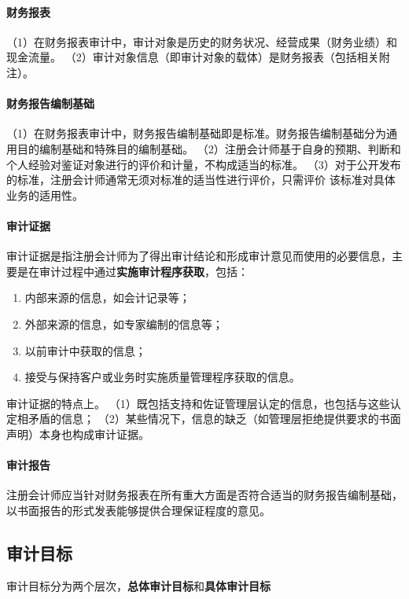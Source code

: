 \documentclass[UTF8,12pt]{ctexart}
\numberwithin{equation}{section} %
\numberwithin{figure}{section}
\numberwithin{table}{section}
\begin{document}
	\paragraph{财务报表}
	（1）在财务报表审计中，审计对象是历史的财务状况、经营成果（财务业绩）和现金流量。
	（2）审计对象信息（即审计对象的载体）是财务报表（包括相关附注）。
	
	\paragraph{财务报告编制基础}
	（1）在财务报表审计中，财务报告编制基础即是标准。财务报告编制基础分为通用目的编制基础和特殊目的编制基础。
	（2）注册会计师基于自身的预期、判断和个人经验对鉴证对象进行的评价和计量，不构成适当的标准。
	（3）对于公开发布的标准，注册会计师通常无须对标准的适当性进行评价，只需评价
	该标准对具体业务的适用性。
	
	\paragraph{审计证据}
	审计证据是指注册会计师为了得出审计结论和形成审计意见而使用的必要信息，主要是在审计过程中通过\textbf{实施审计程序获取}，包括：
	\begin{enumerate}
		\item 内部来源的信息，如会计记录等；
		
		\item 外部来源的信息，如专家编制的信息等；
		
		\item 以前审计中获取的信息；
		
		\item 接受与保持客户或业务时实施质量管理程序获取的信息。
	\end{enumerate}
	
	审计证据的特点上。
	（1）既包括支持和佐证管理层认定的信息，也包括与这些认定相矛盾的信息；
	（2）某些情况下，信息的缺乏（如管理层拒绝提供要求的书面声明）本身也构成审计证据。
	
	\paragraph{审计报告}
	注册会计师应当针对财务报表在所有重大方面是否符合适当的财务报告编制基础，以书面报告的形式发表能够提供合理保证程度的意见。
	
	\subsection{审计目标}
	审计目标分为两个层次，\textbf{总体审计目标}和\textbf{具体审计目标}
	
\end{document}
